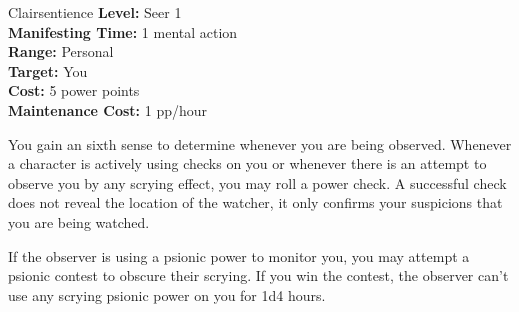 {Clairsentience}
{
	\textbf{Level:}
	Seer 1\\
	\textbf{Manifesting Time:}
	1 mental action\\
	\textbf{Range:}
	Personal\\
	\textbf{Target:}
	You\\
	\textbf{Cost:}
	5 power points\\
	\textbf{Maintenance Cost:}
	1 pp/hour\\
}
{
	You gain an sixth sense to determine whenever you are being observed. Whenever a character is actively using  checks on you or whenever there is an attempt to observe you by any scrying effect, you may roll a power check. A successful check does not reveal the location of the watcher, it only confirms your suspicions that you are being watched.

	If the observer is using a psionic power to monitor you, you may attempt a psionic contest to obscure their scrying. If you win the contest, the observer can't use any scrying psionic power on you for 1d4 hours.
}
